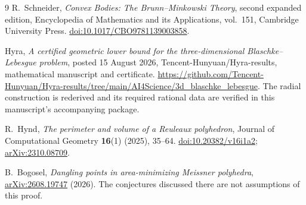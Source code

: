 \documentclass[11pt]{article}
\numberwithin{equation}{section}
\theoremstyle{definition}\newtheorem{definition}[theorem]{Definition}
\theoremstyle{remark}\newtheorem{remark}[theorem]{Remark}
\begin{document}
\begin{thebibliography}{9}
R.~Schneider, \emph{Convex Bodies: The Brunn--Minkowski Theory},
second expanded edition, Encyclopedia of Mathematics and its Applications,
vol.~151, Cambridge University Press.
\href{https://doi.org/10.1017/CBO9781139003858}{doi:10.1017/CBO9781139003858}.

Hyra, \emph{A certified geometric lower bound for the three-dimensional
Blaschke--Lebesgue problem}, posted 15 August 2026,
Tencent-Hunyuan/Hyra-results, mathematical manuscript and certificate.
\url{https://github.com/Tencent-Hunyuan/Hyra-results/tree/main/AI4Science/3d_blaschke_lebesgue}.
The radial construction is rederived and its required rational data are
verified in this manuscript's accompanying package.

R.~Hynd, \emph{The perimeter and volume of a Reuleaux polyhedron},
Journal of Computational Geometry \textbf{16}(1) (2025), 35--64.
\href{https://doi.org/10.20382/v16i1a2}{doi:10.20382/v16i1a2};
\href{https://arxiv.org/abs/2310.08709}{arXiv:2310.08709}.

B.~Bogosel, \emph{Dangling points in area-minimizing Meissner polyhedra},
\href{https://arxiv.org/abs/2608.19747}{arXiv:2608.19747} (2026).
The conjectures discussed there are not assumptions of this proof.
\end{thebibliography}
\end{document}

